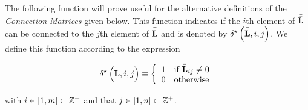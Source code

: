 \documentclass[../ClusteringConnectionsMAIN.tex]{subfiles}
\begin{document}
\begin{flushleft}
\begin{large}


The following function will prove useful for the alternative definitions of the \emph{Connection Matrices} given below.  This function indicates if the $i$th element of $\bar{\bar{\mathbf{L}}}$ can be connected to the $j$th element of $\bar{\bar{\mathbf{L}}}$ and is denoted by $\delta^\star \left( \bar{\bar{\mathbf{L}}}, i, j \right)$.  We define this function according to the expression

\begin{align}
\delta^\star \left( \bar{\bar{\mathbf{L}}}, i, j \right) \equiv \left\{
\begin{array}{l l}
1 & \text{if } \bar{\bar{\mathbf{L}}}_{ij} \neq 0 \\
0 & \text{otherwise}
\end{array}
\right.
\end{align}

with $i \in \left[ 1, m \right] \subset \mathbb{Z}^+$ and that $j \in \left[ 1, n \right] \subset \mathbb{Z}^+$.


\end{large}
\end{flushleft}
\end{document}
